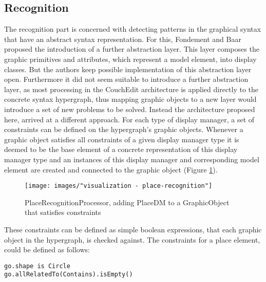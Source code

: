 \subsection{Recognition}
\label{sec:recognition}
The recognition part is concerned with detecting patterns in the graphical syntax that have an abstract syntax representation. For this, Fondement and Baar proposed the introduction of a further abstraction layer. This layer composes the graphic primitives and attributes, which represent a model element, into display classes. But the authors keep possible implementation of this abstraction layer open. Furthermore it did not seem suitable to introduce a further abstraction layer, as most processing in the CouchEdit architecture is applied directly to the concrete syntax hypergraph, thus mapping graphic objects to a new layer would introduce a set of new problems to be solved. Instead the architecture proposed here, arrived at a different approach. For each type of display manager, a set of constraints can be defined on the hypergraph's graphic objects. Whenever a graphic object satisfies all constraints of a given display manager type it is deemed to be the base element of a concrete representation of this display manager type and an instances of this display manager and corresponding model element are created and connected to the graphic object (Figure \ref{fig:place-recognition}).


\begin{figure}
  \centering
  \texttt{[image: images/"visualization - place-recognition"]}
  \caption{PlaceRecognitionProcessor, adding PlaceDM to a GraphicObject that satisfies constraints}
  \label{fig:place-recognition}
\end{figure}

These constraints can be defined as simple boolean expressions, that each graphic object in the hypergraph, is checked against. The constraints for a place element, could be defined as follows:

\begin{lstlisting}[language=OCL,caption={Possible constraints to detect GOs representing a place},captionpos=b]
go.shape is Circle
go.allRelatedTo(Contains).isEmpty()
\end{lstlisting}

